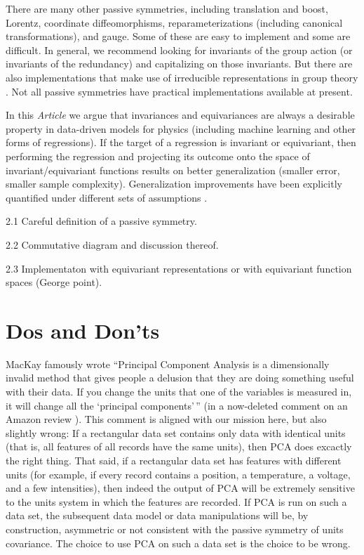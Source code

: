 \documentclass{article}
\theoremstyle{plain}
\theoremstyle{definition}
\theoremstyle{remark}
\newcommand{\documentname}{\textsl{Article}}
\begin{document}
There are many other passive symmetries, including translation and boost, Lorentz, coordinate diffeomorphisms, reparameterizations (including canonical transformations), and gauge.
Some of these are easy to implement and some are difficult.
In general, we recommend looking for invariants of the group action (or invariants of the redundancy) and capitalizing on those invariants.
But there are also implementations that make use of irreducible representations in group theory \cite{fuchs2020se, thomas2018tensor, geiger2022e3nn}.
Not all passive symmetries have practical implementations available at present.

In this \documentname{} we argue that invariances and equivariances are always a desirable property in data-driven models for physics (including machine learning and other forms of regressions).
If the target of a regression is invariant or equivariant, then performing the regression and projecting its outcome onto the space of invariant/equivariant functions results on better generalization (smaller error, smaller sample complexity).
Generalization improvements have been explicitly quantified under different sets of assumptions \cite{bietti2021sample, elesedy2021provably, mei2021learning, elesedy2021kernel}. 

   
   
   
   2.1 Careful definition of a passive symmetry.
   
   2.2 Commutative diagram and discussion thereof.
   
   2.3 Implementaton with equivariant representations or with equivariant function spaces (George point).

\section{Dos and Don'ts}\label{sec:dos}

MacKay famously wrote ``Principal Component Analysis is a dimensionally invalid method that gives people a delusion that they are doing something useful with their data. If you change the units that one of the variables is measured in, it will change all the `principal components'\,'' (in a now-deleted comment on an Amazon review \citealt{muldoonmedium}).
This comment is aligned with our mission here, but also slightly wrong: If a rectangular data set contains only data with identical units (that is, all features of all records have the same units), then PCA does excactly the right thing.
That said, if a rectangular data set has features with different units (for example, if every record contains a position, a temperature, a voltage, and a few intensities), then indeed the output of PCA will be extremely sensitive to the units system in which the features are recorded.
If PCA is run on such a data set, the subsequent data model or data manipulations will be, by construction, asymmetric or not consistent with the passive symmetry of units covariance.
The choice to use PCA on such a data set is the choice to be wrong.
\end{document}

